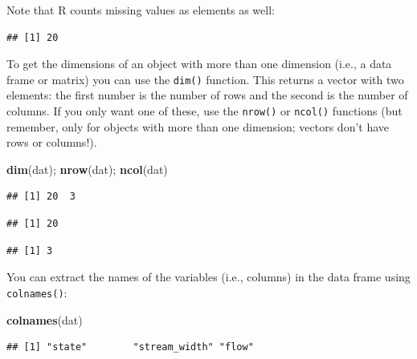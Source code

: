 \documentclass[]{book}
\newenvironment{Shaded}{\begin{snugshade}}{\end{snugshade}}
\newcommand{\KeywordTok}[1]{\textcolor[rgb]{0.13,0.29,0.53}{\textbf{#1}}}
\newcommand{\NormalTok}[1]{#1}
\newcommand{\OperatorTok}[1]{\textcolor[rgb]{0.81,0.36,0.00}{\textbf{#1}}}
\begin{document}
Note that R counts missing values as elements as well:

\begin{Shaded}
\end{Shaded}

\begin{verbatim}
## [1] 20
\end{verbatim}

To get the dimensions of an object with more than one dimension (i.e., a data frame or matrix) you can use the \texttt{dim()} function. This returns a vector with two elements: the first number is the number of rows and the second is the number of columns. If you only want one of these, use the \texttt{nrow()} or \texttt{ncol()} functions (but remember, only for objects with more than one dimension; vectors don't have rows or columns!).

\begin{Shaded}
\begin{Highlighting}[]
\KeywordTok{dim}\NormalTok{(dat); }\KeywordTok{nrow}\NormalTok{(dat); }\KeywordTok{ncol}\NormalTok{(dat)}
\end{Highlighting}
\end{Shaded}

\begin{verbatim}
## [1] 20  3
\end{verbatim}

\begin{verbatim}
## [1] 20
\end{verbatim}

\begin{verbatim}
## [1] 3
\end{verbatim}

You can extract the names of the variables (i.e., columns) in the data frame using \texttt{colnames()}:

\begin{Shaded}
\begin{Highlighting}[]
\KeywordTok{colnames}\NormalTok{(dat)}
\end{Highlighting}
\end{Shaded}

\begin{verbatim}
## [1] "state"        "stream_width" "flow"
\end{verbatim}
\end{document}
